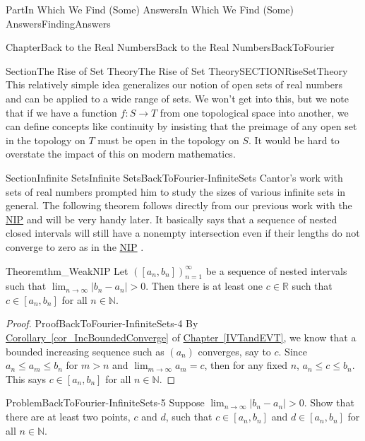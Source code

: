 \documentclass[oneside,10pt,]{book}
\newcommand{\xreffont}{\relax}
\numberwithin{equation}{part}
\newcommand{\abs}[1]{\left|#1\right|}
\def\limit#1#2#3{{\displaystyle\lim_{#1\rightarrow #2}#3}}
\newcommand{\RR}{\mathbb {R}}
\newcommand{\NN}{\mathbb {N}}
\begin{document}
\begin{partptx}{Part}{In Which We Find (Some) Answers}{}{In Which We Find (Some) Answers}{}{}{FindingAnswers}
\begin{chapterptx}{Chapter}{Back to the Real Numbers}{}{Back to the Real Numbers}{}{}{BackToFourier}
\begin{sectionptx}{Section}{The Rise of Set Theory}{}{The Rise of Set Theory}{}{}{SECTIONRiseSetTheory}
This relatively simple idea generalizes our notion of open sets of real numbers and can be applied to a wide range of sets. We won't get into this, but we note that if we have a function \(f:S\to T\) from one topological space into another, we can define concepts like continuity by insisting that the preimage of any open set in the topology on \(T\) must be open in the topology on \(S\).  It would be hard to overstate the impact of this on modern mathematics.%
\end{sectionptx}
%
%
\typeout{************************************************}
\typeout{************************************************}
%
\begin{sectionptx}{Section}{Infinite Sets}{}{Infinite Sets}{}{}{BackToFourier-InfiniteSets}
Cantor's work with sets of real numbers prompted him to study the sizes of various infinite sets in general.  The following theorem follows directly from our previous work with the \hyperref[NIP]{NIP}  and will be very handy later.  It basically says that a sequence of nested closed intervals will still have a non\textendash{}empty intersection even if their lengths do not converge to zero as in the \hyperref[NIP]{NIP} .%
\begin{theorem}{Theorem}{}{}{thm_WeakNIP}%
%
Let \(\left(\left[a_n, b_n\right]\right)_{n=1}^\infty\) be a sequence of nested intervals such that \(\limit{n}{\infty}{\abs{b_n-a_n}}>0\).  Then there is at least one \(c\in\RR\) such that \(c\in\left[a_n,
b_n\right]\) for all \(n\in\NN\).%
\end{theorem}
\begin{proof}{Proof}{}{BackToFourier-InfiniteSets-4}
By \hyperref[cor_IncBoundedConverge]{Corollary~{\xreffont\ref{cor_IncBoundedConverge}}} of \hyperref[IVTandEVT]{Chapter~{\xreffont\ref{IVTandEVT}}}, we know that a bounded increasing sequence such as \((a_n)\) converges, say to \(c\).  Since \(a_n\leq a_m\leq b_n\) for \(m>n\) and \(\limit{m}{\infty}{a_m}=c\), then for any fixed \(n\), \(a_n\leq c\leq b_n\).  This says \(c\in\left[a_n,
b_n\right]\) for all \(n\in\NN\).%
\end{proof}
\begin{problem}{Problem}{}{BackToFourier-InfiniteSets-5}%
Suppose \(\limit{n}{\infty}{\abs{b_n-a_n}}>0\).  Show that there are at least two points, \(c\) and \(d\), such that \(c\in[a_n, b_n]\) and \(d\in[a_n, b_n]\) for all \(n\in\NN\).%
\end{problem}

\end{sectionptx}
\end{chapterptx}
\end{partptx}
\end{document}
